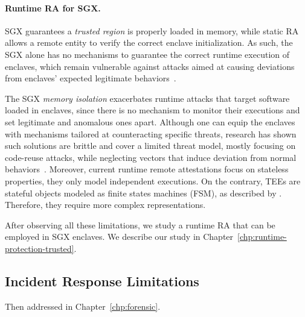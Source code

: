 \paragraph{Runtime RA for SGX.}

SGX guarantees a \emph{trusted region} is properly loaded in memory, while 
static RA allows a remote entity to verify the correct enclave initialization.
As such, the SGX alone has no mechanisms to guarantee the correct runtime 
execution of enclaves, which remain vulnerable against
attacks aimed at causing deviations from enclaves' expected legitimate
behaviors~\citep{tale-two-worlds,251582,biondo2018guard,lee2017hacking,snakegx}.

The SGX \emph{memory isolation} exacerbates runtime attacks that target 
software loaded in enclaves, since there is no mechanism to 
monitor their executions and set legitimate and anomalous ones apart.
Although one can equip the enclaves with mechanisms tailored at counteracting 
specific threats, research has shown such solutions are brittle and cover a 
limited threat model, mostly focusing on code-reuse attacks, while neglecting 
vectors that induce deviation from normal
behaviors~\citep{tale-two-worlds,251582,biondo2018guard,lee2017hacking}.
Moreover, current runtime remote attestations focus on
stateless properties, \ie they only model independent executions.  On
the contrary, TEEs are stateful objects modeled as finite states
machines (FSM), as described by \cite{costan2016intel}.
Therefore, they require more complex representations.

After observing all these limitations, we study a runtime RA that can be
employed in SGX enclaves. We describe our study in 
Chapter~\ref{chp:runtime-protection-trusted}.

\subsection{Incident Response Limitations}
\label{ssec:contribution4}

Then addressed in Chapter~\ref{chp:forensic}.

